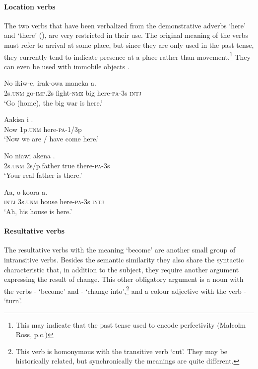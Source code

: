 \paragraph{Location verbs}\label{sec:3:a:z:y:x}
{}
The two verbs that have been verbalized from the demonstrative adverbs  `here' and  `there' (), are very restricted in their use. The original meaning of the verbs must refer to arrival at some place, but since they are only used in the past tense, they currently tend to indicate presence at a place rather than movement.\footnote{This may indicate that the past tense used to encode perfectivity (Malcolm Ross, p.c.)} They can even be used with immobile objects . 

\ea%
\label{ex:3:x1270}
\gll No ikiw-e, irak-owa maneka \textstyleEmphasizedVernacularWords{-}\textstyleEmphasizedVernacularWords{-} a. \\
2s.\textsc{unm} go-\textsc{imp}.2s fight-\textsc{nmz} big here-\textsc{pa}-3s \textsc{intj}\\
\glt`Go (home), the big war is here.'
\z

\ea%
\label{ex:3:x1271}
\gll Aakisa i . \\
Now 1p.\textsc{unm} here-\textsc{pa}-1/3p \\
\glt`Now we are / have come here.'
\z

\ea%
\label{ex:3:x1272}
\gll No niawi akena . \\
2s.\textsc{unm} 2s/p.father true there-\textsc{pa}-3s\\
\glt`Your real father is there.'
\z

\ea%
\label{ex:3:x1276}
\gll Aa, o koora  a. \\
\textsc{intj} 3s.\textsc{unm} house here-\textsc{pa}-3s \textsc{intj}\\
\glt`Ah, his house is here.'
\z

\paragraph{Resultative verbs}\label{sec:3:a:z:y:x}
{}
The resultative verbs with the meaning `become' are another small group of intransitive verbs. Besides the semantic similarity they also share the syntactic characteristic that, in addition to the subject, they require another argument expressing the result of change. This other obligatory argument is a noun with the verbs - `become' and - `change into',\footnote{This verb is homonymous with the transitive verb  `cut'. They may be historically related, but synchronically the meanings are quite different.} and a colour adjective with the verb - `turn'. 

